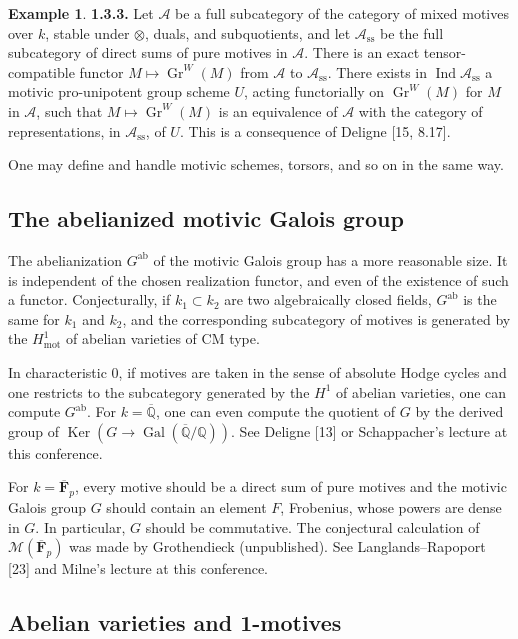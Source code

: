 \documentclass[11pt,a4paper]{article}
\theoremstyle{plain}
\theoremstyle{definition}
\newtheorem{example}[theorem]{Example}
\DeclareMathOperator{\Ker}{Ker}
\DeclareMathOperator{\Gal}{Gal}
\DeclareMathOperator{\Gr}{Gr}
\DeclareMathOperator{\Ind}{Ind}
\newcommand{\Q}{\mathbb{Q}}
\DeclareMathOperator{\mot}{mot}
\newcommand{\ab}{\mathrm{ab}}
\begin{document}
\begin{example}
\textbf{1.3.3.} Let $\mathcal{A}$ be a full subcategory of the category of mixed motives over $k$, stable under $\otimes$, duals, and subquotients, and let $\mathcal{A}_{\mathrm{ss}}$ be the full subcategory of direct sums of pure motives in $\mathcal{A}$. There is an exact tensor-compatible functor $M\mapsto \Gr^W(M)$ from $\mathcal{A}$ to $\mathcal{A}_{\mathrm{ss}}$. There exists in $\Ind\mathcal{A}_{\mathrm{ss}}$ a motivic pro-unipotent group scheme $U$, acting functorially on $\Gr^W(M)$ for $M$ in $\mathcal{A}$, such that $M\mapsto\Gr^W(M)$ is an equivalence of $\mathcal{A}$ with the category of representations, in $\mathcal{A}_{\mathrm{ss}}$, of $U$. This is a consequence of Deligne [15, 8.17].

One may define and handle motivic schemes, torsors, and so on in the same way.
\end{example}

\subsection{The abelianized motivic Galois group}

The abelianization $G^{\ab}$ of the motivic Galois group has a more reasonable size. It is independent of the chosen realization functor, and even of the existence of such a functor. Conjecturally, if $k_1\subset k_2$ are two algebraically closed fields, $G^{\ab}$ is the same for $k_1$ and $k_2$, and the corresponding subcategory of motives is generated by the $H^1_{\mot}$ of abelian varieties of CM type.

In characteristic $0$, if motives are taken in the sense of absolute Hodge cycles and one restricts to the subcategory generated by the $H^1$ of abelian varieties, one can compute $G^{\ab}$. For $k=\overline{\Q}$, one can even compute the quotient of $G$ by the derived group of $\Ker(G\to\Gal(\overline{\Q}/\Q))$. See Deligne [13] or Schappacher's lecture at this conference.

For $k=\overline{\mathbf{F}}_p$, every motive should be a direct sum of pure motives and the motivic Galois group $G$ should contain an element $F$, Frobenius, whose powers are dense in $G$. In particular, $G$ should be commutative. The conjectural calculation of $\mathcal{M}(\overline{\mathbf{F}}_p)$ was made by Grothendieck (unpublished). See Langlands--Rapoport [23] and Milne's lecture at this conference.

\subsection{Abelian varieties and 1-motives}
\end{document}
